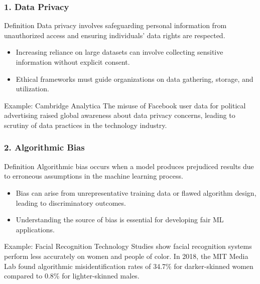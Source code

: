 \documentclass[aspectratio=169]{beamer}
\begin{document}
\begin{frame}[fragile]
    \frametitle{1. Data Privacy}
    \begin{block}{Definition}
        Data privacy involves safeguarding personal information from unauthorized access and ensuring individuals' data rights are respected.
    \end{block}
    
    \begin{itemize}
        \item Increasing reliance on large datasets can involve collecting sensitive information without explicit consent.
        \item Ethical frameworks must guide organizations on data gathering, storage, and utilization.
    \end{itemize}

    \begin{exampleblock}{Example: Cambridge Analytica}
        The misuse of Facebook user data for political advertising raised global awareness about data privacy concerns, leading to scrutiny of data practices in the technology industry.
    \end{exampleblock}
\end{frame}

\begin{frame}[fragile]
    \frametitle{2. Algorithmic Bias}
    \begin{block}{Definition}
        Algorithmic bias occurs when a model produces prejudiced results due to erroneous assumptions in the machine learning process.
    \end{block}
    
    \begin{itemize}
        \item Bias can arise from unrepresentative training data or flawed algorithm design, leading to discriminatory outcomes.
        \item Understanding the source of bias is essential for developing fair ML applications.
    \end{itemize}

    \begin{exampleblock}{Example: Facial Recognition Technology}
        Studies show facial recognition systems perform less accurately on women and people of color. 
        In 2018, the MIT Media Lab found algorithmic misidentification rates of 34.7\% for darker-skinned women compared to 0.8\% for lighter-skinned males.
    \end{exampleblock}
\end{frame}
\end{document}
